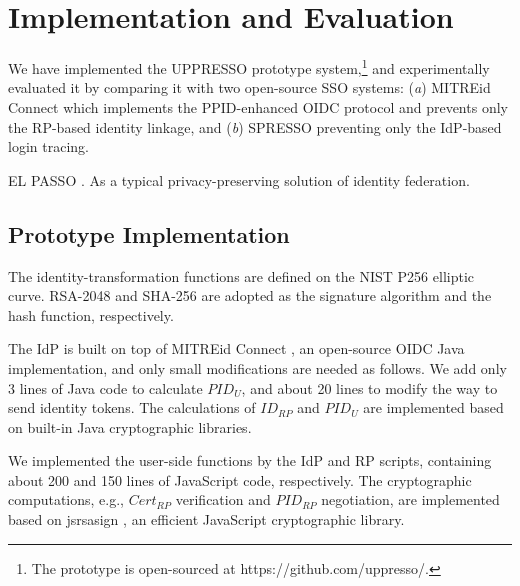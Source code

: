 \section{Implementation and Evaluation}
\label{sec:implementation}
We have implemented the UPPRESSO prototype system,\footnote{The prototype is open-sourced at https://github.com/uppresso/.}
 and experimentally evaluated it
 by comparing it with two open-source SSO systems:
  (\emph{a}) MITREid Connect \cite{MITREid}
    which implements the PPID-enhanced OIDC protocol and prevents only the RP-based identity linkage,
     and (\emph{b}) SPRESSO \cite{SPRESSO} preventing only the IdP-based login tracing.

EL PASSO \cite{ELPASSO}. As a typical privacy-preserving solution of identity federation.

\subsection{Prototype Implementation}
The identity-transformation functions are defined on
        the NIST P256 elliptic curve.
RSA-2048 and SHA-256 are adopted as the signature algorithm and the hash function, respectively.

The IdP is built on top of MITREid Connect \cite{MITREid},
    an open-source OIDC Java implementation, %
    and only small modifications are needed as follows.
We add only 3 lines of Java code to calculate $PID_U$,
    and about 20 lines to modify the way to send identity tokens.
The calculations of $ID_{RP}$ and $PID_U$ are implemented based on built-in Java cryptographic libraries. %

We implemented the user-side functions by the IdP and RP scripts,
     containing about 200 and 150 lines of JavaScript code, respectively.
The cryptographic computations, e.g., $Cert_{RP}$ verification and $PID_{RP}$ negotiation, are implemented based on jsrsasign \cite{jsrsasign}, an efficient JavaScript cryptographic library.

